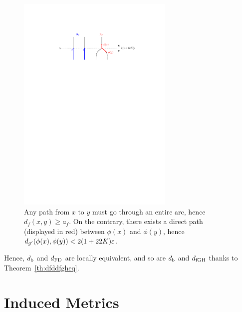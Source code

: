 \begin{figure}[h]\centering
\includegraphics[width=7.5cm]{figures/AttachingMaps}
\caption[Branching argument]{Any path from $x$ to $y$ must go through an entire arc, hence $d_f(x,y)\geq a_f$.
On the contrary, there exists a direct path (displayed in red) between $\phi(x)$ and $\phi(y)$, hence $d_{g'}(\phi(x),\phi(y)) < 2(1+22K)\varepsilon$.}
\label{fig:attach}
\end{figure}

Hence, $d_{\rm b}$ and $d_{\rm FD}$ are locally equivalent, and so are $d_{\rm b}$ and $d_{\rm fGH}$ thanks to Theorem~\ref{th:dfddfgheq}.




















\section{Induced Metrics}
\label{sec:induced}

